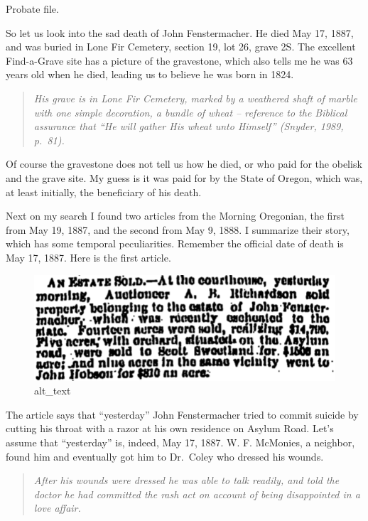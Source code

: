 \documentclass[
  12pt,
]{book}
\begin{document}
Probate file.

So let us look into the sad death of John Fenstermacher. He died May 17, 1887, and was buried in Lone Fir Cemetery, section 19, lot 26, grave 2S. The excellent Find-a-Grave site has a picture of the gravestone, which also tells me he was 63 years old when he died, leading us to believe he was born in 1824.

\begin{quote}
\emph{His grave is in Lone Fir Cemetery, marked by a weathered shaft of marble with one simple decoration, a bundle of wheat -- reference to the Biblical assurance that ``He will gather His wheat unto Himself'' (Snyder, 1989, p.~81).}
\end{quote}

Of course the gravestone does not tell us how he died, or who paid for the obelisk and the grave site. My guess is it was paid for by the State of Oregon, which was, at least initially, the beneficiary of his death.

Next on my search I found two articles from the Morning Oregonian, the first from May 19, 1887, and the second from May 9, 1888. I summarize their story, which has some temporal peculiarities. Remember the official date of death is May 17, 1887. Here is the first article.

\begin{figure}
\centering
\includegraphics{images/0204b_images/image2.png}
\caption{alt\_text}
\end{figure}

The article says that ``yesterday'' John Fenstermacher tried to commit suicide by cutting his throat with a razor at his own residence on Asylum Road. Let's assume that ``yesterday'' is, indeed, May 17, 1887. W. F. McMonies, a neighbor, found him and eventually got him to Dr.~Coley who dressed his wounds.

\begin{quote}
\emph{After his wounds were dressed he was able to talk readily, and told the doctor he had committed the rash act on account of being disappointed in a love affair. }
\end{quote}
\end{document}
